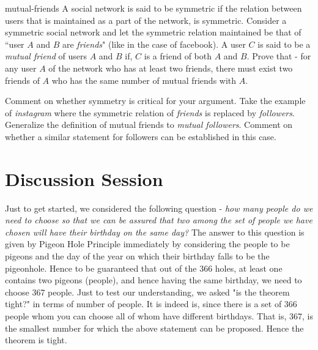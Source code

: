 \begin{exercise-prob}
\begin{show-ps1}{mutual-friends}
A social network is said to be symmetric if the relation between users that is maintained as a part of the network, is symmetric. Consider a symmetric social network  and let the symmetric relation maintained be that of ``user $A$ and $B$ are {\em friends}" (like in the case of facebook). A user $C$ is said to be a \textit{mutual friend} of users $A$ and $B$ if, $C$ is a friend of both $A$ and $B$. Prove that - for any user $A$ of the network who has at least two friends, there must exist two friends of $A$ who has the same number of mutual friends with $A$. 

Comment on whether symmetry is critical for your argument. Take the example of {\em instagram} where the symmetric relation of {\em friends} is replaced by {\em followers}. Generalize the definition of mutual friends to {\em mutual followers}. Comment on whether a similar statement for followers can be established in this case.
\end{show-ps1}
\end{exercise-prob}

\section{Discussion Session}

Just to get started, we considered the following question - \textit{how many people do we need to choose so that we can be assured that two among the set of people we have chosen will have their birthday on the same day?} The answer to this question is given by Pigeon Hole Principle immediately by considering the people to be pigeons and the day of the year on which their birthday falls to be the pigeonhole. Hence to be guaranteed that out of the 366 holes, at least one contains two pigeons (people), and hence having the same birthday, we need to choose 367 people. Just to test our understanding, we asked "is the theorem tight?" in terms of number of people. It is indeed is, since there is a set of 366 people whom you can choose all of whom have different birthdays. That is, 367, is the smallest number for which the above statement can be proposed. Hence the theorem is tight.

